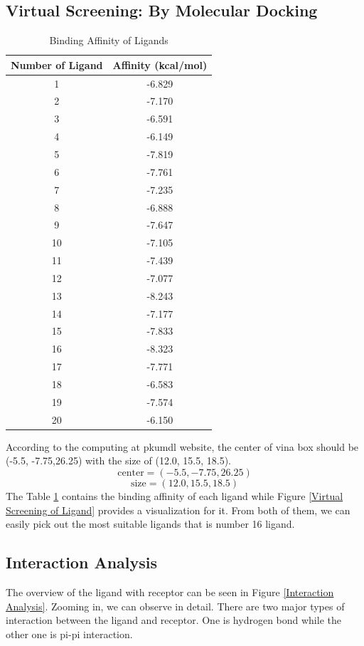 \documentclass{report}
\begin{document}
\subsection{Virtual Screening: By Molecular Docking}
\begin{table}
    \caption{Binding Affinity of Ligands}
    \label{Binding Affinity of 20 Ligands}
    \centering
    \begin{tabular}{|c|c|}
        \toprule
        Number of Ligand & Affinity (kcal/mol) \\
        \midrule
        1 & -6.829 \\
        2 & -7.170 \\
        3 & -6.591 \\
        4 & -6.149 \\
        5 & -7.819 \\
        6 & -7.761 \\
        7 & -7.235 \\
        8 & -6.888 \\
        9 & -7.647 \\
        10 & -7.105 \\
        11 & -7.439 \\
        12 & -7.077 \\
        13 & -8.243 \\
        14 & -7.177 \\
        15 & -7.833 \\
        16 & -8.323 \\
        17 & -7.771 \\
        18 & -6.583 \\
        19 & -7.574 \\
        20 & -6.150 \\
        \bottomrule
        \end{tabular}        
      
\end{table}

According to the computing at pkumdl website, the center of vina box should be (-5.5, -7.75,26.25) with the size of (12.0, 15.5, 18.5).
$$
\text{center} = (-5.5, -7.75,26.25)
$$
$$
\text{size}= (12.0, 15.5, 18.5)
$$
The Table \ref{Binding Affinity of 20 Ligands} contains the binding affinity of each ligand while Figure \ref{Virtual Screening of Ligand} provides a visualization for it.
From both of them, we can easily pick out the most suitable ligands that is number 16 ligand.
\subsection{Interaction Analysis}
The overview of the ligand with receptor can be seen in Figure \ref{Interaction Analysis}.
Zooming in, we can observe in detail.
There are two major types of interaction between the ligand and receptor. One is hydrogen bond while the other one is pi-pi interaction.
\end{document}
